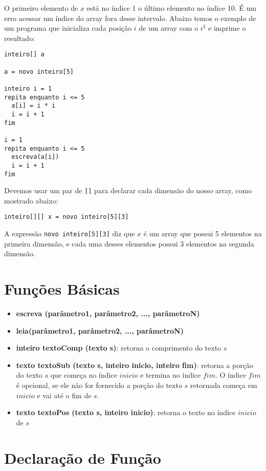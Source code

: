 \documentclass{report}
\begin{document}
{O primeiro elemento de $x$ está no índice 1 o último
elemento no índice 10. É um erro acessar um índice do
array fora desse intervalo. Abaixo temos o exemplo de
um programa que inicializa cada posição $i$ de um array
com o $i^2$ e imprime o resultado:
\begin{verbatim}
inteiro[] a

a = novo inteiro[5]

inteiro i = 1
repita enquanto i <= 5
  a[i] = i * i
  i = i + 1
fim

i = 1
repita enquanto i <= 5
  escreva(a[i])
  i = i + 1
fim
\end{verbatim}


Devemos usar um par de \texttt{[]} para declarar cada dimensão
do nosso array, como mostrado abaixo: 
\begin{verbatim}
inteiro[][] x = novo inteiro[5][3]
\end{verbatim}

A expressão \texttt{novo inteiro[5][3]} diz que $x$ é um
array que possui 5 elementos na primeira dimensão, e cada
uma desses elementos possui 3 elementos na segunda dimensão.


\section{Funções Básicas}

\begin{itemize}
	\item \textbf{escreva (parâmetro1, parâmetro2, ..., parâmetroN)}
	
	\item \textbf{leia(parâmetro1, parâmetro2, ..., parâmetroN)}
	
	\item \textbf{inteiro textoComp (texto s)}: retorna o comprimento do texto $s$
	
	\item \textbf{texto textoSub (texto s, inteiro inicio, inteiro fim)}:
	retorna a porção do texto $s$ que começa no índice $inicio$ e termina
  no índice $fim$. O índice $fim$ é opcional, se ele não for fornecido a
  porção do texto $s$ retornada começa em $inicio$ e vai até o fim de $s$.
	
	\item \textbf{texto textoPos (texto s, inteiro inicio)}:
	retorna o texto no índice $inicio$ de $s$
\end{itemize}


\section{Declaração de Função}

}
\end{document}
